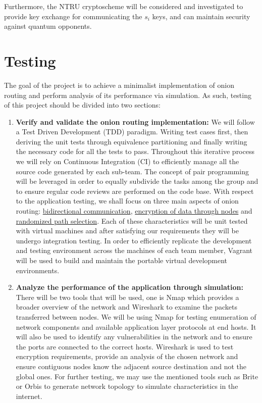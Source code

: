 \documentclass[10pt]{article}
\begin{document}
\noindent Furthermore, the NTRU cryptoscheme will be considered and investigated to
provide key exchange for communicating the $s_i$ keys, and can maintain
security against quantum opponents.

\section*{Testing}
The goal of the project is to achieve a minimalist implementation of onion
routing and perform analysis of its performance via simulation. As such,
testing of this project should be divided into two sections:
\begin{enumerate}
	\item \textbf{Verify and validate the onion routing implementation:} We
		will follow a Test Driven Development (TDD) paradigm. Writing test
		cases first, then deriving the unit tests through equivalence
		partitioning and finally writing the necessary code for all the tests
		to pass. Throughout this iterative process we will rely on Continuous
		Integration (CI) to efficiently manage all the source code generated by
		each sub-team. The concept of pair programming will be leveraged in
		order to equally subdivide the tasks among the group and to ensure
		regular code reviews are performed on the code base. With respect to
		the application testing, we shall focus on three main aspects of onion
		routing: \underline{bidirectional communication}, \underline{encryption
		of data through nodes} and \underline{randomized path selection}. Each
		of these characteristics will be unit tested with virtual machines and
		after satisfying our requirements they will be undergo integration
		testing. In order to efficiently replicate the development and testing
		environment across the machines of each team member, Vagrant will be
		used to build and maintain the portable virtual development
		environments.
	\item \textbf{Analyze the performance of the application through
		simulation:} There will be two tools that will be used, one is Nmap
		which provides a broader overview of the network and Wireshark to
		examine the packets transferred between nodes. We will be using Nmap
		for testing enumeration of network components and available application
		layer protocols at end hosts. It will also be used to identify any
		vulnerabilities in the network and to ensure the ports are connected to
		the correct hosts. Wireshark is used to test encryption requirements,
		provide an analysis of the chosen network and ensure contiguous nodes
		know the adjacent source destination and not the global ones. For
		further testing, we may use the mentioned tools such as Brite or Orbis
		to generate network topology to simulate characteristics in the
		internet.


\end{enumerate}
\end{document}
